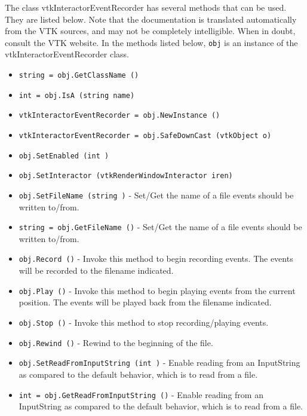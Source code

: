 The class vtkInteractorEventRecorder has several methods that can be used.
  They are listed below.
Note that the documentation is translated automatically from the VTK sources,
and may not be completely intelligible.  When in doubt, consult the VTK website.
In the methods listed below, \verb|obj| is an instance of the vtkInteractorEventRecorder class.
\begin{itemize}
\item  \verb|string = obj.GetClassName ()|

\item  \verb|int = obj.IsA (string name)|

\item  \verb|vtkInteractorEventRecorder = obj.NewInstance ()|

\item  \verb|vtkInteractorEventRecorder = obj.SafeDownCast (vtkObject o)|

\item  \verb|obj.SetEnabled (int )|

\item  \verb|obj.SetInteractor (vtkRenderWindowInteractor iren)|

\item  \verb|obj.SetFileName (string )| -  Set/Get the name of a file events should be written to/from.

\item  \verb|string = obj.GetFileName ()| -  Set/Get the name of a file events should be written to/from.

\item  \verb|obj.Record ()| -  Invoke this method to begin recording events. The events will be
 recorded to the filename indicated.

\item  \verb|obj.Play ()| -  Invoke this method to begin playing events from the current position.
 The events will be played back from the filename indicated.

\item  \verb|obj.Stop ()| -  Invoke this method to stop recording/playing events.

\item  \verb|obj.Rewind ()| -  Rewind to the beginning of the file.

\item  \verb|obj.SetReadFromInputString (int )| -  Enable reading from an InputString as compared to the default
 behavior, which is to read from a file.

\item  \verb|int = obj.GetReadFromInputString ()| -  Enable reading from an InputString as compared to the default
 behavior, which is to read from a file.


\end{itemize}
